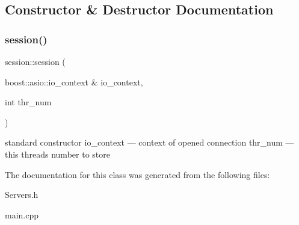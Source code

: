 \subsection{Constructor \& Destructor Documentation}
\mbox{\label{classsession_aba171d4b6627a93b189c4accbefac6ba}} 
\subsubsection{\texorpdfstring{session()}{session()}}
{\footnotesize\ttfamily session\+::session (\begin{DoxyParamCaption}\item[{boost\+::asio\+::io\+\_\+context \&}]{io\+\_\+context,  }\item[{int}]{thr\+\_\+num }\end{DoxyParamCaption})\hspace{0.3cm}{\ttfamily [inline]}}

standard constructor io\+\_\+context --- context of opened connection thr\+\_\+num --- this thread\textquotesingle{}s number to store 

The documentation for this class was generated from the following files\+:\begin{DoxyCompactItemize}
\item 
Servers.\+h\item 
main.\+cpp\end{DoxyCompactItemize}
